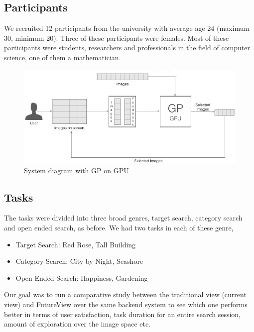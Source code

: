 \documentclass[english]{tktltiki}
\begin{document}
\subsection{Participants}

We recruited 12 participants from the university with average age 24 (maximum 30, minimum 20). Three of these participants were females. Most of these participants were students, researchers and professionals in the field of computer science, one of them a mathematician.

\begin{figure}[h!]
  \centering
    \includegraphics[width=1.0\textwidth]{figures/Imse_System_Diagram_2}
    \caption{System diagram with GP on GPU}
    \label{system_diagram_2}
\end{figure}



\subsection{Tasks}

The tasks were divided into three broad genres, target search, category search and open ended search, as before. We had two tasks in each of these genre,

\begin{itemize}
	\item Target Search: Red Rose, Tall Building
	\item Category Search: City by Night, Seashore
	\item Open Ended Search: Happiness, Gardening
\end{itemize}

Our goal was to run a comparative study between the traditional view (current view) and FutureView over the same backend system to see which one performs better in terms of user satisfaction, task duration for an entire search session, amount of exploration over the image space etc.
\end{document}
